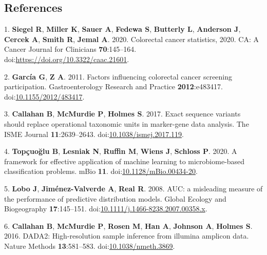 \documentclass[]{article}
\begin{document}
\newpage

\subsection{References}\label{references}

1. \textbf{{Siegel} R}, \textbf{{Miller} K}, \textbf{{Sauer} A},
\textbf{{Fedewa} S}, \textbf{{Butterly} L}, \textbf{{Anderson} J},
\textbf{{Cercek} A}, \textbf{{Smith} R}, \textbf{{Jemal} A}. 2020.
Colorectal cancer statistics, 2020. CA: A Cancer Journal for Clinicians
\textbf{70}:145--164.
doi:\href{http://dx.doi.org/https://doi.org/10.3322/caac.21601}{https://doi.org/10.3322/caac.21601}.

2. \textbf{{García} G}, \textbf{{Z} A}. 2011. Factors influencing
colorectal cancer screening participation. Gastroenterology Research and
Practice \textbf{2012}:e483417.
doi:\href{http://dx.doi.org/10.1155/2012/483417}{10.1155/2012/483417}.

3. \textbf{{Callahan} B}, \textbf{{McMurdie} P}, \textbf{{Holmes} S}.
2017. Exact sequence variants should replace operational taxonomic units
in marker-gene data analysis. The ISME Journal \textbf{11}:2639--2643.
doi:\href{http://dx.doi.org/10.1038/ismej.2017.119}{10.1038/ismej.2017.119}.

4. \textbf{{Topçuo{ğ}lu} B}, \textbf{{Lesniak} N}, \textbf{{Ruffin} M},
\textbf{{Wiens} J}, \textbf{{Schloss} P}. 2020. A framework for
effective application of machine learning to microbiome-based
classification problems. mBio \textbf{11}.
doi:\href{http://dx.doi.org/10.1128/mBio.00434-20}{10.1128/mBio.00434-20}.

5. \textbf{{Lobo} J}, \textbf{{Jiménez-Valverde} A}, \textbf{{Real} R}.
2008. AUC: a misleading measure of the performance of predictive
distribution models. Global Ecology and Biogeography
\textbf{17}:145--151.
doi:\href{http://dx.doi.org/10.1111/j.1466-8238.2007.00358.x}{10.1111/j.1466-8238.2007.00358.x}.

6. \textbf{{Callahan} B}, \textbf{{McMurdie} P}, \textbf{{Rosen} M},
\textbf{{Han} A}, \textbf{{Johnson} A}, \textbf{{Holmes} S}. 2016.
DADA2: High-resolution sample inference from illumina amplicon data.
Nature Methods \textbf{13}:581--583.
doi:\href{http://dx.doi.org/10.1038/nmeth.3869}{10.1038/nmeth.3869}.
\end{document}

